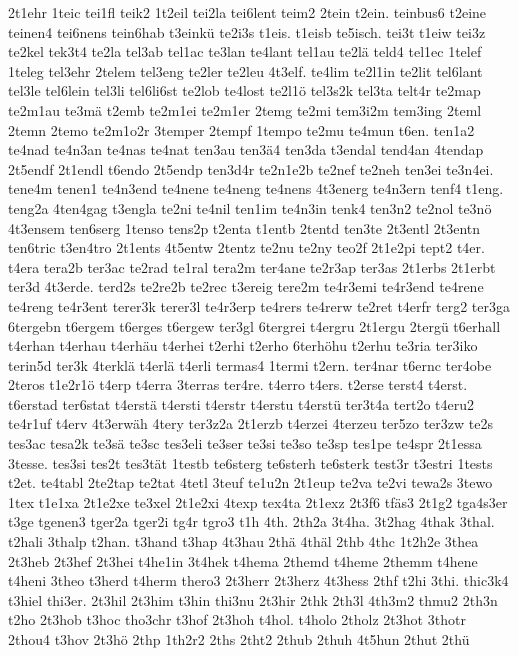 {2t1ehr
1teic
tei1fl
teik2
1t2eil
tei2la
tei6lent
teim2
2tein
t2ein.
teinbus6
t2eine
teinen4
tei6nens
tein6hab
t3einkü
te2i3s
t1eis.
t1eisb
te5isch.
tei3t
t1eiw
tei3z
te2kel
tek3t4
te2la
tel3ab
tel1ac
te3lan
te4lant
tel1au
te2lä
teld4
tel1ec
1telef
1teleg
tel3ehr
2telem
tel3eng
te2ler
te2leu
4t3elf.
te4lim
te2l1in
te2lit
tel6lant
tel3le
tel6lein
tel3li
tel6li6st
te2lob
te4lost
te2l1ö
tel3s2k
tel3ta
telt4r
te2map
te2m1au
te3mä
t2emb
te2m1ei
te2m1er
2temg
te2mi
tem3i2m
tem3ing
2teml
2temn
2temo
te2m1o2r
3temper
2tempf
1tempo
te2mu
te4mun
t6en.
ten1a2
te4nad
te4n3an
te4nas
te4nat
ten3au
ten3ä4
ten3da
t3endal
tend4an
4tendap
2t5endf
2t1endl
t6endo
2t5endp
ten3d4r
te2n1e2b
te2nef
te2neh
ten3ei
te3n4ei.
tene4m
tenen1
te4n3end
te4nene
te4neng
te4nens
4t3energ
te4n3ern
tenf4
t1eng.
teng2a
4ten4gag
t3engla
te2ni
te4nil
ten1im
te4n3in
tenk4
ten3n2
te2nol
te3nö
4t3ensem
ten6serg
1tenso
tens2p
t2enta
t1entb
2tentd
ten3te
2t3entl
2t3entn
ten6tric
t3en4tro
2t1ents
4t5entw
2tentz
te2nu
te2ny
teo2f
2t1e2pi
tept2
t4er.
t4era
tera2b
ter3ac
te2rad
te1ral
tera2m
ter4ane
te2r3ap
ter3as
2t1erbs
2t1erbt
ter3d
4t3erde.
terd2s
te2re2b
te2rec
t3ereig
tere2m
te4r3emi
te4r3end
te4rene
te4reng
te4r3ent
terer3k
terer3l
te4r3erp
te4rers
te4rerw
te2ret
t4erfr
terg2
ter3ga
6tergebn
t6ergem
t6erges
t6ergew
ter3gl
6tergrei
t4ergru
2t1ergu
2tergü
t6erhall
t4erhan
t4erhau
t4erhäu
t4erhei
t2erhi
t2erho
6terhöhu
t2erhu
te3ria
ter3iko
terin5d
ter3k
4terklä
t4erlä
t4erli
termas4
1termi
t2ern.
ter4nar
t6ernc
ter4obe
2teros
t1e2r1ö
t4erp
t4erra
3terras
ter4re.
t4erro
t4ers.
t2erse
terst4
t4erst.
t6erstad
ter6stat
t4erstä
t4ersti
t4erstr
t4erstu
t4erstü
ter3t4a
tert2o
t4eru2
te4r1uf
t4erv
4t3erwäh
4tery
ter3z2a
2t1erzb
t4erzei
4terzeu
ter5zo
ter3zw
te2s
tes3ac
tesa2k
te3sä
te3sc
tes3eli
te3ser
te3si
te3so
te3sp
tes1pe
te4spr
2t1essa
3tesse.
tes3si
tes2t
tes3tät
1testb
te6sterg
te6sterh
te6sterk
test3r
t3estri
1tests
t2et.
te4tabl
2te2tap
te2tat
4tetl
3teuf
te1u2n
2t1eup
te2va
te2vi
tewa2s
3tewo
1tex
t1e1xa
2t1e2xe
te3xel
2t1e2xi
4texp
tex4ta
2t1exz
2t3f6
tfäs3
2t1g2
tga4s3er
t3ge
tgenen3
tger2a
tger2i
tg4r
tgro3
t1h
4th.
2th2a
3t4ha.
3t2hag
4thak
3thal.
t2hali
3thalp
t2han.
t3hand
t3hap
4t3hau
2thä
4thäl
2thb
4thc
1t2h2e
3thea
2t3heb
2t3hef
2t3hei
t4he1in
3t4hek
t4hema
2themd
t4heme
2themm
t4hene
t4heni
3theo
t3herd
t4herm
thero3
2t3herr
2t3herz
4t3hess
2thf
t2hi
3thi.
thic3k4
t3hiel
thi3er.
2t3hil
2t3him
t3hin
thi3nu
2t3hir
2thk
2th3l
4th3m2
thmu2
2th3n
t2ho
2t3hob
t3hoc
tho3chr
t3hof
2t3hoh
t4hol.
t4holo
2tholz
2t3hot
3thotr
2thou4
t3hov
2t3hö
2thp
1th2r2
2ths
2tht2
2thub
2thuh
4t5hun
2thut
2thü
}
